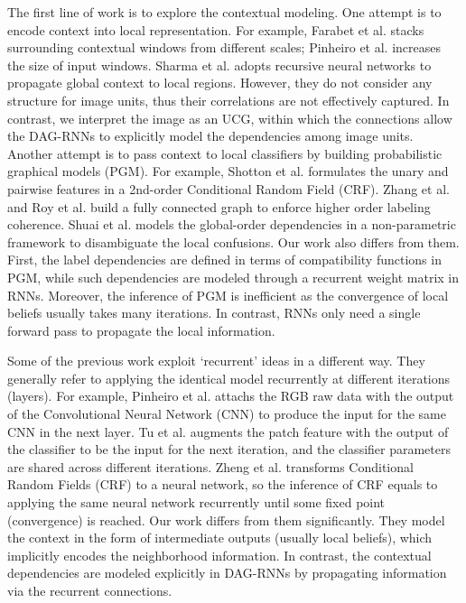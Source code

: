 \documentclass[10pt,twocolumn,letterpaper]{article}
\begin{document}
The first line of work is to explore the contextual modeling. One attempt is to encode context into local representation. For example, Farabet et al. \cite{farabet2013learning} stacks surrounding contextual windows from different scales; Pinheiro et al. \cite{pinheiro2014recurrent} increases the size of input windows. Sharma et al. \cite{sharma2014recursive} adopts recursive neural networks to propagate global context to local regions.
However, they do not consider any structure for image units, thus their correlations are not effectively captured. In contrast, we interpret the image as an UCG, within which the connections allow the DAG-RNNs to explicitly model the dependencies among image units.
Another attempt is to pass context to local classifiers by building probabilistic graphical models (PGM). For example, Shotton et al. \cite{shotton2006textonboost} formulates the unary and pairwise features in a 2nd-order Conditional Random Field (CRF). Zhang et al.\cite{zhang2012efficient} and Roy et al. \cite{royscene} build a fully connected graph to enforce higher order labeling coherence. Shuai et al.\cite{shuai2015integrating} models the global-order dependencies in a non-parametric framework to disambiguate the local confusions. Our work also differs from them. First, the label dependencies are defined in terms of compatibility functions in PGM, while such dependencies are modeled through a recurrent weight matrix in RNNs. Moreover, the inference of PGM is inefficient as the convergence of local beliefs usually takes many iterations. In contrast, RNNs only need a single forward pass to propagate the local information.

Some of the previous work exploit `recurrent' ideas in a different way. They generally refer to applying the identical model recurrently at different iterations (layers). For example, Pinheiro et al.\cite{pinheiro2014recurrent} attachs the RGB raw data with the output of the Convolutional Neural Network (CNN) to produce the input for the same CNN in the next layer. Tu et al.\cite{tu2008auto} augments the patch feature with the output of the classifier to be the input for the next iteration, and the classifier parameters are shared across different iterations. Zheng et al.\cite{zheng2015conditional} transforms Conditional Random Fields (CRF) to a neural network, so the inference of CRF equals to applying the same neural network recurrently until some fixed point (convergence) is reached. Our work differs from them significantly. They model the context in the form of intermediate outputs (usually local beliefs), which implicitly encodes the neighborhood information. In contrast, the contextual dependencies are modeled explicitly in DAG-RNNs by propagating information via the recurrent connections.
\end{document}
